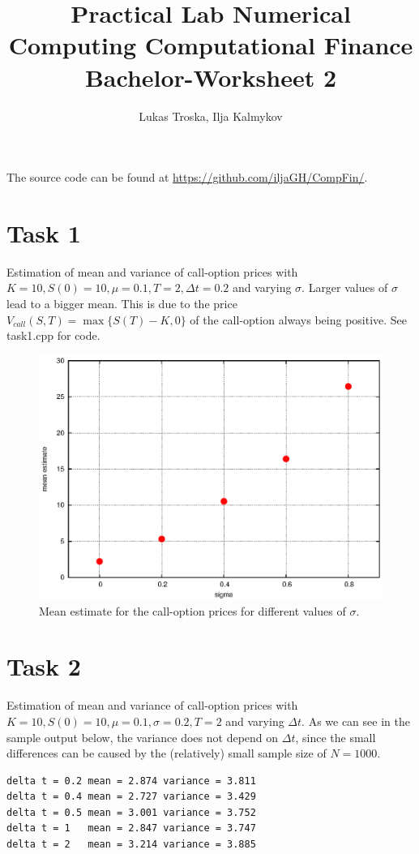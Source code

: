 \documentclass[]{article}
\title{Practical Lab Numerical Computing Computational Finance \\Bachelor-Worksheet 2}
\author{Lukas Troska, Ilja Kalmykov}
\date{}
\begin{document}
\maketitle 

The source code can be found at \url{https://github.com/iljaGH/CompFin/}.

\section*{Task 1} Estimation of mean and variance of call-option prices with $K=10,S(0)=10,\mu=0.1,T=2,\Delta t=0.2$ and varying $\sigma$. Larger values of $\sigma$ lead to a bigger mean. This is
due to the price  $V_{call}\left(S,T\right)= \max \lbrace S(T)-K,0 \rbrace$ of the call-option always being positive. See task1.cpp for code.
\begin{figure}[!ht]
\centering
\includegraphics{task1Plot}
\caption{Mean estimate for the call-option prices for different values of
$\sigma$.}
\label{fig:Task1}
\end{figure}


\section*{Task 2} Estimation of mean and variance of call-option prices with $K=10,S(0)=10,\mu=0.1,\sigma=0.2,T=2$ and varying $\Delta t$. As we can see in the sample output below, the variance does not depend on $\Delta t$, since the small differences can be caused by the (relatively) small sample size of $N=1000$.
\begin{lstlisting}[caption = Estimated $\mu$ and $\sigma$ for
different values of $\Delta t$ using 1000 samples, captionpos=b, label=lst:Task2] 
delta t = 0.2 mean = 2.874 variance = 3.811
delta t = 0.4 mean = 2.727 variance = 3.429
delta t = 0.5 mean = 3.001 variance = 3.752
delta t = 1   mean = 2.847 variance = 3.747
delta t = 2   mean = 3.214 variance = 3.885
\end{lstlisting}
\end{document}
